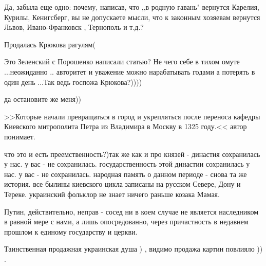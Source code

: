 \begin{itemize}
Да, забыла еще одно: почему, написав, что ,,в родную гавань" вернутся Карелия, Курилы, Кенигсберг, вы не допускаете мысли, что к законным хозяевам вернутся Львов, Ивано-Франковск , Тернополь и т.д.?

 
Продалась Крюкова рагулям(

 
Это Зеленский с Порошенко написали статью? Не чего себе в тихом омуте ...неожиданно .. авторитет и уважение можно нарабатывать годами а потерять в один день ...Так ведь госпожа Крюкова?))))

 
да остановите же меня)) 

>>Которые начали превращаться в город и укрепляться
после переноса кафедры Киевского митрополита Петра из Владимира в Москву в 1325
году.<< автор понимает. 

что это и есть преемственность?)так же как и про князей - династия сохранилась
у нас. у вас - не сохранилась. государственность этой династии сохранилась у
нас. у вас - не сохранилась. народная память о данном периоде - снова та же
история. все былины киевского цикла записаны на русском Севере, Дону и Тереке.
украинский фольклор не знает ничего раньше козака Мамая.

Путин, действительно, неправ - сосед ни в коем случае не является наследником в
равной мере с нами, а лишь опосредованно, через причастность в недавнем прошлом
к единому государству и церкви.

 
Таинственная продажная украинская душа ) , видимо продажа картин повлияло )) .


\end{itemize}
